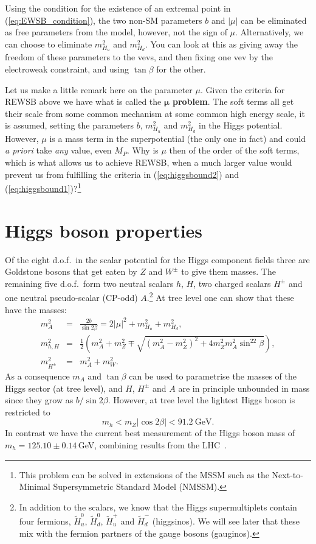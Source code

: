 \documentclass[notes.tex]{subfiles}
\begin{document}
Using the condition for the existence of an extremal point in (\ref{eq:EWSB_condition}), the two non-SM parameters $b$ and $|\mu|$ can be eliminated as free parameters from the model, however, not the sign of $\mu$. Alternatively, we can choose to eliminate $m_{H_u}^2$ and $m_{H_d}^2$. You can look at this as giving away the freedom of these parameters to the vevs, and then fixing one vev by the electroweak constraint, and using $\tan\beta$ for the other.

Let us make a little remark here on the parameter $\mu$. Given the criteria for REWSB above we have what is called the {\bf $\boldsymbol \mu$ problem}. The soft terms all get their scale from some common mechanism at some common high energy scale, it is assumed, setting the parameters $b$, $m_{H_u}^2$ and $m_{H_d}^2$ in the Higgs potential.  However, $\mu$ is a mass term in the superpotential (the only one in fact) and could {\it a priori} take {\it any} value, even $M_P$. Why is $\mu$ then of the order of the soft terms, which is what allows us to achieve REWSB, when a much larger value would prevent us from fulfilling the criteria in  (\ref{eq:higgsbound2}) and (\ref{eq:higgsbound1})?\footnote{This problem can be solved in extensions of the MSSM such as the Next-to-Minimal Supersymmetric Standard Model (NMSSM).}


\section{Higgs boson properties}
Of the eight d.o.f.\ in the scalar potential for the Higgs component fields three are Goldstone bosons that get eaten by $Z$ and $W^\pm$ to give them masses. The remaining five d.o.f.\ form two neutral scalars $h$, $H$, two charged scalars $H^\pm$ and one neutral pseudo-scalar (CP-odd) $A$.\footnote{In addition to the scalars, we know that the Higgs supermultiplets contain four fermions, $\tilde{H}^0_u$, $\tilde{H}^0_d$, $\tilde{H}^+_u$ and $\tilde{H}^-_d$ (higgsinos). We will see later that these mix with the fermion partners of the gauge bosons (gauginos).} At tree level one can show that these have the masses:
\begin{eqnarray}
m_A^2 &=& \frac{2b}{\sin2\beta} = 2|\mu|^2 + m_{H_u}^2 + m_{H_d}^2,\\
m_{h, H}^2 &=& \frac{1}{2}\left(m_A^2 + m_Z^2 \mp \sqrt{(m_A^2- m_Z^2)^2 + 4m_Z^2m_A^2\sin^22\beta}\right),\\
m_{H^\pm}^2 &=& m_A^2 + m_W^2.
\end{eqnarray}
As a consequence $m_A$ and $\tan\beta$ can be used to parametrise the masses of the Higgs sector (at tree level), and
$H$, $H^\pm$ and $A$ are in principle unbounded in mass since they grow as $b/\sin2\beta$. However, at tree level the lightest Higgs boson is restricted to
\begin{equation}
m_h < m_Z|\cos 2\beta| < 91.2~\text{GeV}.
\end{equation}
In contrast we have the current best measurement of the Higgs boson mass of $m_h=125.10\pm 0.14$\,GeV, combining results from the LHC~\cite{ParticleDataGroup:2020ssz}.
\end{document}
